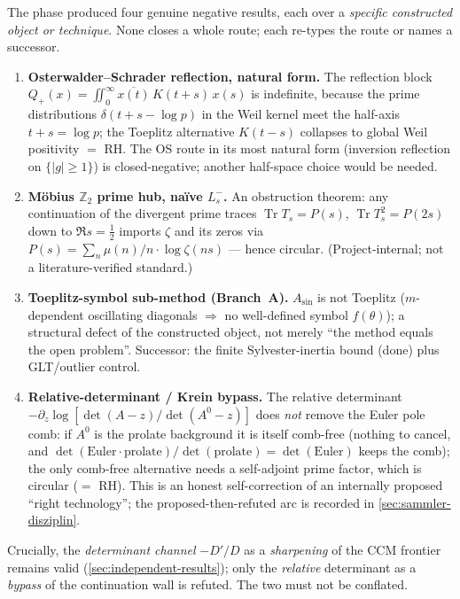 \documentclass[12pt,a4paper]{article}
\theoremstyle{definition}
\theoremstyle{remark}
\begin{document}
The phase produced four genuine negative results, each over a \emph{specific
constructed object or technique}. None closes a whole route; each re-types the
route or names a successor.

\begin{enumerate}
  \item \textbf{Osterwalder--Schrader reflection, natural form.} The reflection
    block $Q_+(x)=\iint_0^\infty \overline{x(t)}\,K(t+s)\,x(s)$ is indefinite,
    because the prime distributions $\delta(t+s-\log p)$ in the Weil kernel meet
    the half-axis $t+s=\log p$; the Toeplitz alternative $K(t-s)$ collapses to
    global Weil positivity $=$ RH. The OS route in its most natural form
    (inversion reflection on $\{|g|\ge 1\}$) is closed-negative; another
    half-space choice would be needed.
  \item \textbf{M\"obius $\mathbb{Z}_2$ prime hub, na\"ive $L_s^-$.} An
    obstruction theorem: any continuation of the divergent prime traces
    $\operatorname{Tr}T_s=P(s)$, $\operatorname{Tr}T_s^2=P(2s)$ down to
    $\Re s=\tfrac12$ imports $\zeta$ and its zeros via
    $P(s)=\sum_n \mu(n)/n\cdot\log\zeta(ns)$ --- hence circular. (Project-internal;
    not a literature-verified standard.)
  \item \textbf{Toeplitz-symbol sub-method (Branch~A).} $A_{\sin}$ is not Toeplitz
    ($m$-dependent oscillating diagonals $\Rightarrow$ no well-defined symbol
    $f(\theta)$); a structural defect of the constructed object, not merely
    ``the method equals the open problem''. Successor: the finite Sylvester-inertia
    bound (done) plus GLT/outlier control.
  \item \textbf{Relative-determinant / Krein bypass.} The relative determinant
    $-\partial_z\log[\det(A-z)/\det(A^0-z)]$ does \emph{not} remove the Euler pole
    comb: if $A^0$ is the prolate background it is itself comb-free (nothing to
    cancel, and $\det(\text{Euler}\cdot\text{prolate})/\det(\text{prolate})
    =\det(\text{Euler})$ keeps the comb); the only comb-free alternative needs a
    self-adjoint prime factor, which is circular ($=$ RH). This is an honest
    self-correction of an internally proposed ``right technology''; the
    proposed-then-refuted arc is recorded in \cref{sec:sammler-disziplin}.
\end{enumerate}

\noindent
Crucially, the \emph{determinant channel} $-D'/D$ as a \emph{sharpening} of the CCM
frontier remains valid (\cref{sec:independent-results}); only the \emph{relative}
determinant as a \emph{bypass} of the continuation wall is refuted. The two must
not be conflated.
\end{document}
